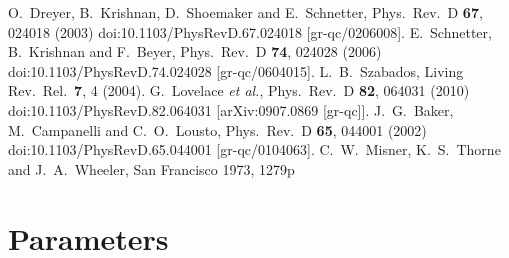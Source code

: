 \begin{thebibliography}{9}
O.~Dreyer, B.~Krishnan, D.~Shoemaker and E.~Schnetter,
  Phys.\ Rev.\ D {\bf 67}, 024018 (2003)
  doi:10.1103/PhysRevD.67.024018
  [gr-qc/0206008].
  E.~Schnetter, B.~Krishnan and F.~Beyer,
  Phys.\ Rev.\ D {\bf 74}, 024028 (2006)
  doi:10.1103/PhysRevD.74.024028
  [gr-qc/0604015].
  L.~B.~Szabados,
  Living Rev.\ Rel.\  {\bf 7}, 4 (2004).
  G.~Lovelace {\it et al.},
  Phys.\ Rev.\ D {\bf 82}, 064031 (2010)
  doi:10.1103/PhysRevD.82.064031
  [arXiv:0907.0869 [gr-qc]].
  J.~G.~Baker, M.~Campanelli and C.~O.~Lousto,
  Phys.\ Rev.\ D {\bf 65}, 044001 (2002)
  doi:10.1103/PhysRevD.65.044001
  [gr-qc/0104063].
  C.~W.~Misner, K.~S.~Thorne and J.~A.~Wheeler,
  San Francisco 1973, 1279p


\end{thebibliography}




\section{Parameters} 


